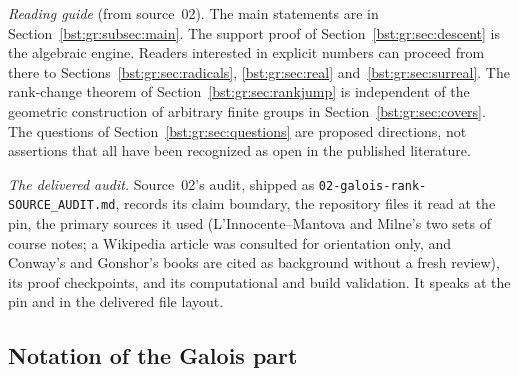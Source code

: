 \documentclass[11pt,letterpaper]{article}
\theoremstyle{definition}
\theoremstyle{remark}
\begin{document}
\emph{Reading guide} (from source~02). The main statements are in
Section~\ref{bst:gr:subsec:main}. The support proof of
Section~\ref{bst:gr:sec:descent} is the algebraic engine. Readers interested
in explicit numbers can proceed from there to
Sections~\ref{bst:gr:sec:radicals}, \ref{bst:gr:sec:real}
and~\ref{bst:gr:sec:surreal}. The rank-change theorem of
Section~\ref{bst:gr:sec:rankjump} is independent of the geometric
construction of arbitrary finite groups in Section~\ref{bst:gr:sec:covers}.
The questions of Section~\ref{bst:gr:sec:questions} are proposed directions,
not assertions that all have been recognized as open in the published
literature.

\emph{The delivered audit.} Source~02's audit, shipped as
\texttt{02-galois-rank-SOURCE\_AUDIT.md}, records its claim boundary, the
repository files it read at the pin, the primary sources it used
(L'Innocente--Mantova and Milne's two sets of course notes; a Wikipedia
article was consulted for orientation only, and Conway's and Gonshor's books
are cited as background without a fresh review), its proof checkpoints, and
its computational and build validation. It speaks at the pin and in the
delivered file layout.

\subsection{Notation of the Galois part}\label{bst:gr:subsec:notation}
\end{document}
